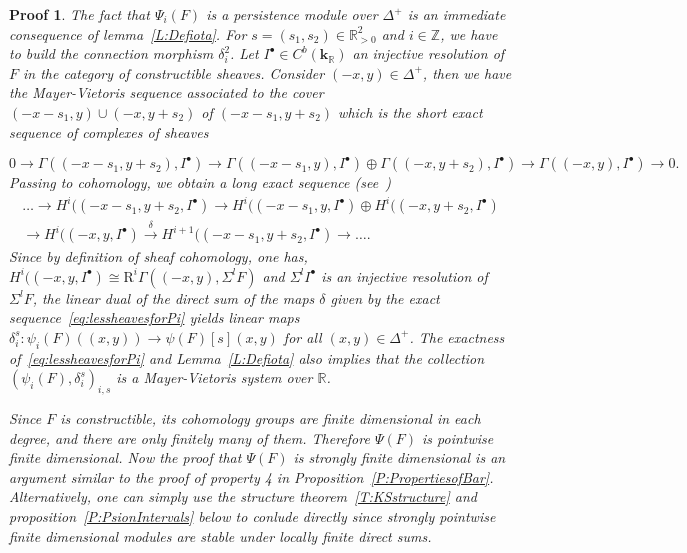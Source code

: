 \documentclass[a4paper, english, 11pt]{article}
\newcommand{\kk}[0]{\textbf{k}}
\newcommand{\0}{\vec{0}}
\newcommand{\R}[0]{\mathbb{R}}
\newcommand{\Z}[0]{\mathbb{Z}}
\newcommand{\Rr}[0]{\text{R}}
\newtheorem*{pf}{Proof} }
\begin{document}
\begin{pf} The fact that $\Psi_i(F)$ is a persistence module over $\Delta^+$ is an immediate consequence of lemma~\ref{L:Defiota}.
For $s = (s_1,s_2)\in \R^2_{>0}$ and $i\in\Z$, we have to build the connection morphism $\delta_i^2$. Let $I^\bullet\in C^b(\kk_\R)$ an injective resolution of $F$ in the category of constructible sheaves. Consider $(-x,y)\in \Delta^+$, then we have the Mayer-Vietoris sequence associated to the cover $(-x - s_1 , y) \cup (-x , y + s_2) $ of $(-x - s_1 , y + s_2)$ which is the short exact sequence of complexes of sheaves 

$$0 \longrightarrow \Gamma((-x - s_1 , y + s_2), I^\bullet) \longrightarrow \Gamma((-x - s_1 , y), I^\bullet) \oplus  \Gamma((-x , y+s_2), I^\bullet) \longrightarrow \Gamma((-x,y), I^\bullet) \longrightarrow 0 .$$
Passing to cohomology, we obtain a long exact sequence (see~\cite{Kash90}) 
\begin{multline}\label{eq:lessheavesforPi} 
\dots \to     H^i((-x-s_1, y+s_2, I^\bullet) \to 
 H^i((-x-s_1, y, I^\bullet) \oplus  H^i((-x, y+s_2, I^\bullet) \\ \to 
  H^i((-x, y, I^\bullet) \stackrel{\delta}\to H^{i+1}((-x-s_1, y+s_2, I^\bullet) \to \dots.
\end{multline}
Since by definition of sheaf cohomology, one has, $H^i((-x, y, I^\bullet) \cong \Rr^i\Gamma \left ( (-x,y) , \Sigma^l F\right )$ and $\Sigma^l I^\bullet$ is an injective resolution of $\Sigma^l F$, the linear dual of the direct sum of the maps $\delta$ given by the exact sequence~\eqref{eq:lessheavesforPi} yields linear maps $\delta_i^s:\psi_i(F)((x,y)) \to \psi(F)[s](x,y)$ for all $(x,y) \in \Delta^+$. The exactness of~\eqref{eq:lessheavesforPi} and Lemma~\ref{L:Defiota} also implies that the collection $(\psi_i(F), \delta_i^s)_{i,s}$ is a Mayer-Vietoris system over $\R$.

Since $F$ is constructible, its cohomology groups are finite dimensional in each degree, and there are only finitely many of them. Therefore $\Psi(F)$ is pointwise finite dimensional. Now the proof that $\Psi(F)$ is strongly finite dimensional is an argument similar to the proof of property 4 in Proposition~\ref{P:PropertiesofBar}. Alternatively, one can simply use the structure theorem~\ref{T:KSstructure}
and proposition~\ref{P:PsionIntervals} below to conlude directly since  strongly pointwise finite dimensional modules are stable under locally finite direct sums.\end{pf}
\end{document}
